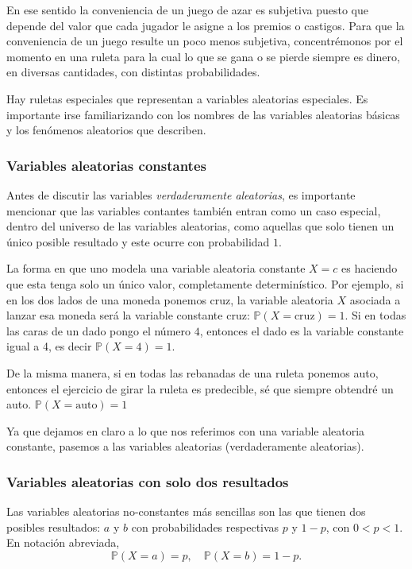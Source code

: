En ese sentido la conveniencia de un juego de azar es subjetiva puesto que depende del valor que cada jugador le asigne a los premios o castigos. Para que la conveniencia de un juego resulte un poco menos subjetiva, concentrémonos por el momento en una ruleta para la cual lo que se gana o se pierde siempre es dinero, en diversas cantidades, con distintas probabilidades.

Hay ruletas especiales que representan a variables aleatorias especiales. Es importante irse familiarizando con los nombres de las variables aleatorias básicas y los fenómenos aleatorios que describen.

\subsubsection*{Variables aleatorias constantes}

Antes de discutir las variables \emph{verdaderamente aleatorias}, es importante mencionar que las variables contantes también entran como un caso especial, dentro del universo de las variables aleatorias, como aquellas que solo tienen un único posible resultado y este ocurre con probabilidad $1$.

La forma en que uno modela una variable aleatoria constante $X = c$ es haciendo que esta tenga solo un único valor, completamente determinístico. Por ejemplo, si en los dos lados de una moneda ponemos cruz, la variable aleatoria $X$ asociada a lanzar esa moneda será la variable constante cruz: $\mathbb P(X=\text{cruz})=1$. Si en todas las caras de un dado pongo el número $4$, entonces el dado es la variable constante igual a 4, es decir $\mathbb P(X=4)=1$. 

De la misma manera, si en todas las rebanadas de una ruleta ponemos auto, entonces el ejercicio de girar la ruleta es predecible, sé que siempre obtendré un auto. $\mathbb P(X=\text{auto})=1$

Ya que dejamos en claro a lo que nos referimos con una variable aleatoria constante, pasemos a las variables aleatorias (verdaderamente aleatorias).

\subsubsection*{Variables aleatorias con solo dos resultados}

Las variables aleatorias no-constantes más sencillas son las que tienen dos posibles resultados: $a$ y $b$ con probabilidades respectivas $p$ y $1-p$, con $0 < p < 1$. En notación abreviada, $$\mathbb P (X=a)=p,\quad \mathbb P (X=b)=1-p.$$

